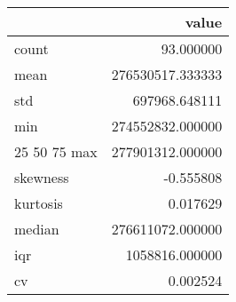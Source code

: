 \begin{tabular}{lr}
\toprule
 & value \\
\midrule
count & 93.000000 \\
mean & 276530517.333333 \\
std & 697968.648111 \\
min & 274552832.000000 \\
25%
50%
75%
max & 277901312.000000 \\
skewness & -0.555808 \\
kurtosis & 0.017629 \\
median & 276611072.000000 \\
iqr & 1058816.000000 \\
cv & 0.002524 \\
\bottomrule
\end{tabular}
